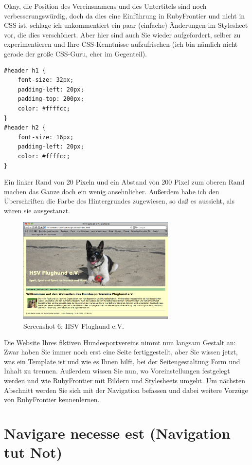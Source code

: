 \documentclass[11pt]{report}
\begin{document}
Okay, die Position des Vereinsnamens und des Untertitels sind noch
verbesserungswürdig, doch da dies eine Einführung in RubyFrontier und
nicht in CSS ist, schlage ich unkommentiert ein paar (einfache)
Änderungen im Stylesheet vor, die dies verschönert. Aber hier sind
auch Sie wieder aufgefordert, selber zu experimentieren und Ihre
CSS-Kenntnisse aufzufrischen (ich bin nämlich nicht gerade der große
CSS-Guru, eher im Gegenteil).


\begin{verbatim}
#header h1 {
    font-size: 32px;
    padding-left: 20px;
    padding-top: 200px;
    color: #ffffcc;
}
#header h2 {
    font-size: 16px;
    padding-left: 20px;
    color: #ffffcc;
}
\end{verbatim}

Ein linker Rand von 20 Pixeln und ein Abstand von 200 Pixel zum oberen
Rand machen das Ganze doch ein wenig ansehnlicher. Außerdem habe ich
den Überschriften die Farbe des Hintergrundes zugewiesen, so daß es
aussieht, als wären sie ausgestanzt.

\begin{figure}[h!]
\centering
\includegraphics[width=0.7\textwidth]{./images/flughund06.png}
\caption{\label{flughund06}Screenshot 6: HSV Flughund e.V.}
\end{figure}

Die Website Ihres fiktiven Hundesportvereins nimmt nun langsam Gestalt
an: Zwar haben Sie immer noch erst eine Seite fertiggestellt, aber Sie
wissen jetzt, was ein Template ist und wie es Ihnen hilft, bei der
Seitengestaltung Form und Inhalt zu trennen. Außerdem wissen Sie nun,
wo Voreinstellungen festgelegt werden und wie RubyFrontier mit Bildern
und Stylesheets umgeht. Um nächsten Abschnitt werden Sie sich mit der
Navigation befassen und dabei weitere Vorzüge von RubyFrontier
kennenlernen.
\section{Navigare necesse est (Navigation tut Not)}
\label{sec-2-1-2}
\end{document}
